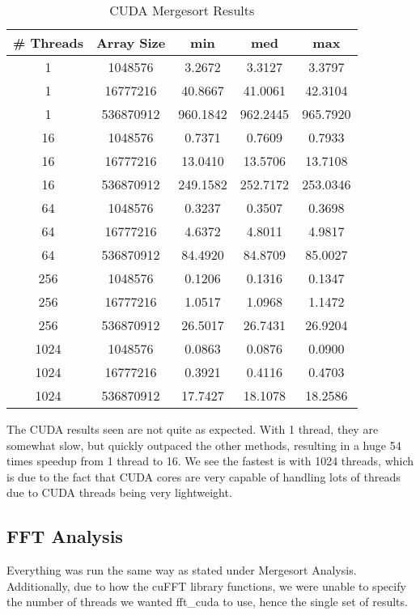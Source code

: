 \documentclass[conference,12pt]{IEEEtran}
\begin{document}
		\begin{table}[ht]
		\caption{CUDA Mergesort Results} 
		\centering  
		\begin{tabular}{c c | c c c} 
		\hline\hline                        
		\# Threads & Array Size & min  & med & max\\ [0.5ex] %
		\hline                 
		1 & 1048576 &3.2672 &3.3127 & 3.3797  \\ 
		1 & 16777216 & 40.8667 & 41.0061 & 42.3104  \\
		1 & 536870912 & 960.1842  & 962.2445 &965.7920    \\
		\hline
		16 & 1048576 &0.7371 & 0.7609 & 0.7933  \\ 
		16 & 16777216 &13.0410 &13.5706 & 13.7108   \\
		16 & 536870912 & 249.1582  & 252.7172 &253.0346   \\
		\hline
		64 & 1048576 & 0.3237 &0.3507 & 0.3698  \\ 
		64 & 16777216 & 4.6372 & 4.8011 & 4.9817  \\
		64 & 536870912 & 84.4920  & 84.8709 &85.0027   \\
		\hline
		256 & 1048576 & 0.1206 & 0.1316 & 0.1347  \\ 
		256 & 16777216 & 1.0517 & 1.0968 & 1.1472  \\
		256 & 536870912 & 26.5017  & 26.7431 &26.9204\\
		\hline
		1024 & 1048576 & 0.0863 & 0.0876 & 0.0900  \\
		1024 & 16777216 & 0.3921 & 0.4116 & 0.4703  \\
		1024 & 536870912 & 17.7427  & 18.1078 &18.2586 \\
		\hline 
		\end{tabular}
		\label{table:cudamerge} %
		\end{table}
		The CUDA results seen are not quite as expected. With 1 thread, they are somewhat slow, but quickly outpaced the other methods, resulting in a huge 54 times speedup from 1 thread to 16.  We see the fastest is with 1024 threads, which is due to the fact that CUDA cores are very capable of handling lots of threads due to CUDA threads being very lightweight.

\subsection{FFT Analysis}
	Everything was run the same way as stated under Mergesort Analysis. Additionally, due to how the cuFFT library functions, we were unable to specify the number of threads we wanted fft\_cuda to use, hence the single set of results.
\end{document}
